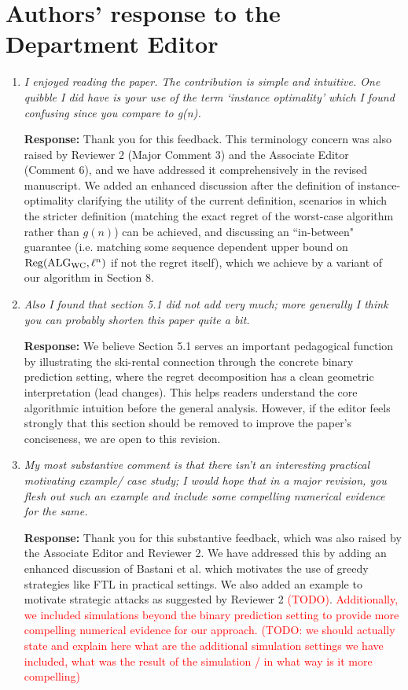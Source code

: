 \documentclass[11pt]{article}
\begin{document}
\section*{Authors' response to the Department Editor}
\begin{enumerate}
    \item \emph{I enjoyed reading the paper. The contribution is simple and intuitive. One quibble I did have is your use of the term `instance optimality' which I found confusing since you compare to g(n).}

    {\bf Response:} Thank you for this feedback. This terminology concern was also raised by Reviewer 2 (Major Comment 3) and the Associate Editor (Comment 6), and we have addressed it comprehensively in the revised manuscript. We added an enhanced discussion after the definition of instance-optimality clarifying the utility of the current definition, scenarios in which the stricter definition (matching the exact regret of the worst-case algorithm rather than $g(n)$) can be achieved, and discussing an ``in-between" guarantee (i.e. matching some sequence dependent upper bound on $\mathrm{Reg}(\text{ALG}_{\text{WC}}, \ell^n)$ if not the regret itself), which we achieve by a variant of our algorithm in Section 8. 

       

    \item \emph{Also I found that section 5.1 did not add very much; more generally I think you can probably shorten this paper quite a bit. }

    {\bf Response:} We believe Section 5.1 serves an important pedagogical function by illustrating the ski-rental connection through the concrete binary prediction setting, where the regret decomposition has a clean geometric interpretation (lead changes). This helps readers understand the core algorithmic intuition before the general analysis. However, if the editor feels strongly that this section should be removed to improve the paper's conciseness, we are open to this revision.

    \item \emph{My most substantive comment is that there isn't an interesting practical motivating example/ case study; I would hope that in a major revision, you flesh out such an example and include some compelling numerical evidence for the same. }

    {\bf Response:} Thank you for this substantive feedback, which was also raised by the Associate Editor and Reviewer 2. We have addressed this by adding an enhanced discussion of Bastani et al. \cite{bastani2021mostly} which motivates the use of greedy strategies like FTL in practical settings. We also added an example to motivate strategic attacks as suggested by Reviewer 2 \textcolor{red}{(TODO)}. \textcolor{red}{Additionally, we included simulations beyond the binary prediction setting to provide more compelling numerical evidence for our approach.}
    \textcolor{red}{(TODO: we should actually state and explain here what are the additional simulation settings we have included, what was the result of the simulation / in what way is it more compelling)}
\end{enumerate}
\end{document}
